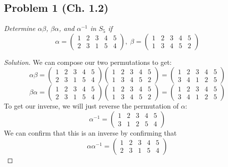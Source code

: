 \documentclass{article}
\begin{document}
\subsection*{Problem 1 (Ch. 1.2)}
{\it Determine $\alpha \beta$, $\beta \alpha$, and $\alpha^{-1}$ in $S_5$ if
\[
	\alpha = \begin{pmatrix} 1 & 2 & 3 & 4 & 5 \\ 2 & 3 & 1 & 5 & 4 \end{pmatrix},
	\; \beta = \begin{pmatrix} 1 & 2 & 3 & 4 & 5 \\ 1 & 3 & 4 & 5 & 2 \end{pmatrix}
\]}

\begin{proof}[Solution]\let\qed\relax
	We can compose our two permutations to get:
	\[
		\alpha \beta = 
		\begin{pmatrix} 1 & 2 & 3 & 4 & 5 \\ 2 & 3 & 1 & 5 & 4 \end{pmatrix}
		\begin{pmatrix} 1 & 2 & 3 & 4 & 5 \\ 1 & 3 & 4 & 5 & 2 \end{pmatrix}
		= \begin{pmatrix} 1 & 2 & 3 & 4 & 5 \\ 3 & 4 & 1 & 2 & 5 \end{pmatrix}
	\]
	\[
		\beta\alpha = 
		\begin{pmatrix} 1 & 2 & 3 & 4 & 5 \\ 2 & 3 & 1 & 5 & 4 \end{pmatrix}
		\begin{pmatrix} 1 & 2 & 3 & 4 & 5 \\ 1 & 3 & 4 & 5 & 2 \end{pmatrix}
		= \begin{pmatrix} 1 & 2 & 3 & 4 & 5 \\ 3 & 4 & 1 & 2 & 5 \end{pmatrix}
	\]
	To get our inverse, we will just reverse the permutation of $\alpha$:
	\[
		\alpha^{-1} = 
		\begin{pmatrix} 1 & 2 & 3 & 4 & 5 \\ 3 & 1 & 2 & 5 & 4 \end{pmatrix}
	\]
	We can confirm that this is an inverse by confirming that
	\[
		\alpha \alpha^{-1} =
		\begin{pmatrix} 1 & 2 & 3 & 4 & 5 \\ 2 & 3 & 1 & 5 & 4 \end{pmatrix}
\]
\end{proof}
\end{document}
